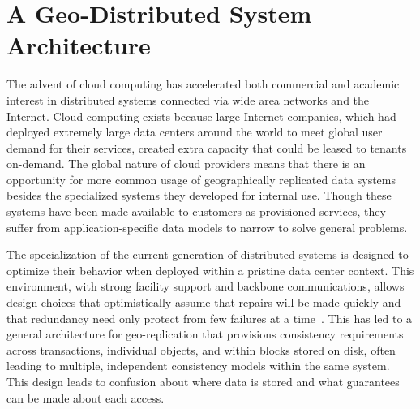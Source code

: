 
\renewcommand{\thechapter}{2}

\chapter{A Geo-Distributed System Architecture}
\label{ch:architecture}




The advent of cloud computing has accelerated both commercial and academic interest in distributed systems connected via wide area networks and the Internet.
Cloud computing exists because large Internet companies, which had deployed extremely large data centers around the world to meet global user demand for their services, created extra capacity that could be leased to tenants on-demand.
The global nature of cloud providers means that there is an opportunity for more common usage of geographically replicated data systems besides the specialized systems they developed for internal use.
Though these systems have been made available to customers as provisioned services, they suffer from application-specific data models to narrow to solve general problems.

The specialization of the current generation of distributed systems is designed to optimize their behavior when deployed within a pristine data center context.
This environment, with strong facility support and backbone communications, allows design choices that optimistically assume that repairs will be made quickly and that redundancy need only protect from few failures at a time~\cite{bermbach_eventual_2011,wada_data_2011,node_failure,jhawar_fault_2013}.
This has led to a general architecture for geo-replication that provisions consistency requirements across transactions, individual objects, and within blocks stored on disk, often leading to multiple, independent consistency models within the same system.
This design leads to confusion about where data is stored and what guarantees can be made about each access.

